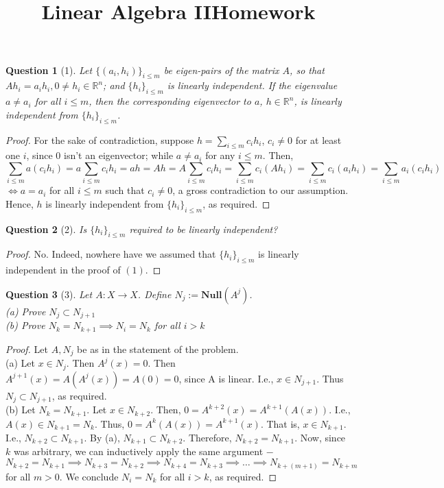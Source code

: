 \documentclass[11pt]{article}
\title{\vspace{-50pt}
\Huge \name
\\\vspace{20pt}
\huge Linear Algebra II\hfill Homework \hw}
\author{}
\date{}
\theoremstyle{quest}
\newtheorem*{question}{Question}
\begin{document}
\maketitle

\begin{question}[1]
Let $\{(a_i, h_i)\}_{i \le m}$ be eigen-pairs of the matrix $A$, so that $Ah_i = a_i h_i, 0 \ne h_i \in \mathbb{R}^n$; and $\{h_i\}_{i \le m}$ is linearly independent. If the eigenvalue $a \ne a_i$ for all $i \le m$, then the  corresponding eigenvector to $a$, $h \in \mathbb{R}^n$, is linearly independent from $\{h_i\}_{i \le m}$.
\end{question}
\begin{proof}
  For the sake of contradiction, suppose $h = \sum_{i \le m} c_i h_i$, $c_i \ne 0$ for at least one $i$, since $0$ isn't an eigenvector; while $a \ne a_i$ for any $i \le m$. Then,
  $$\sum_{i \le m} a (c_i h_i) = a \sum_{i \le m} c_i h_i = ah = Ah = A \sum_{i \le m} c_i h_i = \sum_{i \le m} c_i (A h_i) = \sum_{i \le m} c_i (a_i h_i) = \sum_{i \le m} a_i (c_i h_i)$$ $\iff a = a_i$ for all $i \le m$ such that $c_i \ne 0$, a gross contradiction to our assumption. Hence, $h$ is linearly independent from $\{h_i\}_{i \le m}$, as required.
\end{proof}

\begin{question}[2]
Is $\{h_i\}_{i \le m}$ required to be linearly independent?
\end{question}
\begin{proof}
  No. Indeed, nowhere have we assumed that $\{h_i\}_{i \le m}$ is linearly independent in the proof of $(1)$.
\end{proof}

\begin{question}[3]
Let $A: X \rightarrow X$. Define $N_j := \mathbf{Null}(A^j)$.
\\(a) Prove $N_j \subset N_{j+1}$
\\(b) Prove $N_k = N_{k+1} \implies N_i = N_k$ for all $i > k$
\end{question}
\begin{proof}
  Let $A, N_j$ be as in the statement of the problem.
  \\(a) Let $x \in N_j$. Then $A^j(x) = 0$. Then $A^{j+1}(x) = A(A^j(x)) = A(0) = 0$, since A is linear. I.e., $x \in N_{j+1}$. Thus $N_j \subset N_{j+1}$, as required.
  \\(b) Let $N_k = N_{k+1}$. Let $x \in N_{k+2}$. Then, $0 = A^{k+2}(x) = A^{k+1}(A(x))$. I.e., $A(x) \in N_{k+1} = N_k$. Thus, $0 = A^k(A(x)) = A^{k+1}(x)$. That is, $x \in N_{k+1}$. I.e., $N_{k+2} \subset N_{k+1}$. By (a), $N_{k+1} \subset N_{k+2}$. Therefore, $N_{k+2} = N_{k+1}$. Now, since $k$ was arbitrary, we can inductively apply the same argument $-$ $$N_{k+2} = N_{k+1} \implies N_{k+3} = N_{k+2} \implies N_{k+4} = N_{k+3} \implies \ldots \implies N_{k+(m+1)} = N_{k+m}$$ for all $m > 0$. We conclude $N_i = N_k$ for all $i > k$, as required.
\end{proof}
\end{document}
